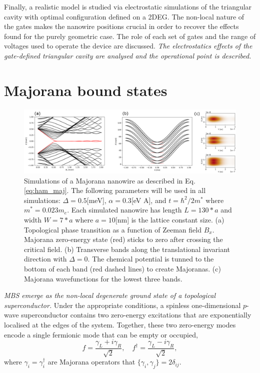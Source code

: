 Finally, a realistic model is studied via electrostatic simulations of the triangular cavity with optimal configuration defined on a 2DEG.
The non-local nature of the gates makes the nanowire positions crucial in order to recover the effects found for the purely geometric case.
The role of each set of gates and the range of voltages used to operate the device are discussed.
\textit{The electrostatics effects of the gate-defined triangular cavity are analysed and the operational point is described.}


\section{Majorana bound states}

\begin{figure}[h!!]
\centering
  \includegraphics[width=\linewidth]{figures/majorana_intro.pdf}
  \caption{Simulations of a Majorana nanowire as described in Eq. \eqref{eq:ham_maj}. The following parameters will be used in all simulations:  $\Delta=0.5$[meV], $\alpha=0.3$[eV A], and $t=\hbar^2/2m^*$ where $m^*=0.023 m_e$. Each simulated nanowire has length $L=130*a$ and width $W=7*a$ where $a=10$[nm] is the lattice constant size. (a) Topological phase transition as a function of Zeeman field $B_x$. Majorana zero-energy state (red) sticks to zero after crossing the critical field. (b)  Transverse bands along the translational invariant direction with $\Delta=0$. The chemical potential is tunned to the bottom of each band (red dashed lines) to create Majoranas. (c) Majorana wavefunctions for the lowest three bands.}
  \label{fig:rectangular_cavity}
\end{figure}

\textit{MBS emerge as the non-local degenerate ground state of a topological superconductor.}
Under the appropriate conditions, a spinless one-dimensional $p$-wave superconductor contains two zero-energy excitations that are exponentially localised at the edges of the system. 
Together, these two zero-energy modes encode a single fermionic mode that can be empty or occupied, 
\begin{equation}
f = \frac{\gamma_{L} + i\gamma_{R}}{\sqrt{2}}, \quad f^{\dagger} = \frac{\gamma_{L} - i \gamma_{R}}{\sqrt{2}},
\end{equation}
where $\gamma_{i} = \gamma_{i}^{\dagger}$ are Majorana operators that $\{ \gamma_{i}, \gamma_{j} \} = 2\delta_{ij}$.

